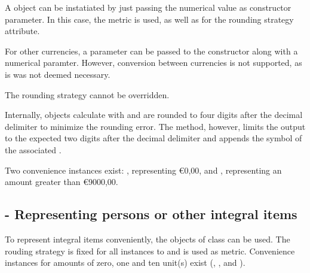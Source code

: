 A  object can be instatiated by just passing the numerical value as constructor parameter.
In this case, the metric  is used, as well as  for the rounding strategy attribute.

For other currencies, a  parameter can be passed to the constructor along with a numerical paramter.
However, conversion between currencies is not supported, as is was not deemed necessary.

The rounding strategy cannot be overridden.

Internally,  objects calculate with and are rounded to four digits after the decimal delimiter to minimize the rounding error.
The  method, however, limits the output to the expected two digits after the decimal delimiter and appends the symbol of the associated .

Two convenience instances exist: , representing \euro{0,00}, and , representing an amount greater than \euro{9000,00}.

\subsection{ - Representing persons or other integral items}
To represent integral items conveniently, the objects of class  can be used.
The rouding strategy is fixed for all instances to  and  is used as metric.
Convenience instances for amounts of zero, one and ten unit(s) exist (, , and ).
